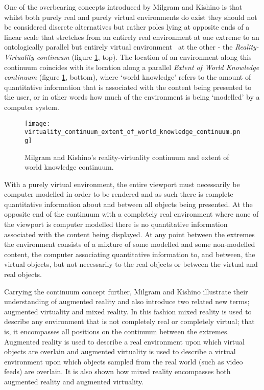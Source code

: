 
One of the overbearing concepts introduced by Milgram and Kishino is that whilst both purely real and purely virtual environments do exist they should not be considered discrete alternatives but rather poles lying at opposite ends of a linear scale that stretches from an entirely real environment at one extreme to an ontologically parallel but entirely virtual environment~\cite{Qvortrup2002} at the other - the \textit{Reality-Virtuality continuum} (figure \ref{reality_virtuality_extent_of_world_knowledge_continuum}, top). The location of an environment along this continuum coincides with its location along a parallel \textit{Extent of World Knowledge continuum} (figure \ref{reality_virtuality_extent_of_world_knowledge_continuum}, bottom), where `world knowledge' refers to the amount of quantitative information that is associated with the content being presented to the user, or in other words how much of the environment is being `modelled' by a computer system.

\begin{figure}[h]
\centering
\texttt{[image: virtuality\_continuum\_extent\_of\_world\_knowledge\_continuum.png]}
\caption{Milgram and Kishino's reality-virtuality continuum and extent of world knowledge continuum.}
\label{reality_virtuality_extent_of_world_knowledge_continuum}
\end{figure}

With a purely virtual environment, the entire viewport must necessarily be computer modelled in order to be rendered and as such there is complete quantitative information about and between all objects being presented. At the opposite end of the continuum with a completely real environment where none of the viewport is computer modelled there is no quantitative information associated with the content being displayed. At any point between the extremes the environment consists of a mixture of some modelled and some non-modelled content, the computer associating quantitative information to, and between, the virtual objects, but not necessarily to the real objects or between the virtual and real objects.

Carrying the continuum concept further, Milgram and Kishino illustrate their understanding of augmented reality and also introduce two related new terms; augmented virtuality and mixed reality. In this fashion mixed reality is used to describe any environment that is not completely real or completely virtual; that is, it encompasses all positions on the continuum between the extremes. Augmented reality is used to describe a real environment upon which virtual objects are overlain and augmented virtuality is used to describe a virtual environment upon which objects sampled from the real world (such as video feeds) are overlain. It is also shown how mixed reality encompasses both augmented reality and augmented virtuality.

